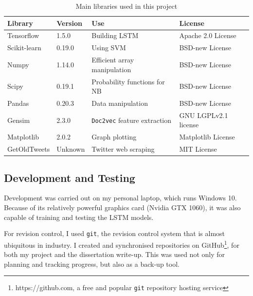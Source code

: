 \documentclass[12pt,a4paper,twoside,openright]{report}
\begin{document}
\begin{table}[H]
\centering
\begin{tabular}{llll}
\toprule
\textbf{Library}                        & \textbf{Version} & \textbf{Use} & \textbf{License} \\ \midrule
Tensorflow                             & 1.5.0            & Building LSTM        & Apache 2.0 License              \\ [0.5ex]
Scikit-learn                           & 0.19.0           & Using SVM        & BSD-new License              \\ [0.5ex]
Numpy                                  & 1.14.0           & Efficient array manipulation        & BSD-new License              \\ [0.5ex]
Scipy                                  & 0.19.1           & Probability functions for NB        & BSD-new License              \\ [0.5ex]
Pandas                                 & 0.20.3           & Data manipulation        & BSD-new License              \\ [0.5ex]
Gensim								   & 2.3.0			  &	\texttt{Doc2vec} feature extraction			& GNU LGPLv2.1 license\\ [0.5ex]
Matplotlib							   & 2.0.2			  & Graph plotting 				& Matplotlib License	\\ [0.5ex]
GetOldTweets                           & Unknown          & Twitter web scraping        & MIT License              \\ [0.5ex] \bottomrule
\end{tabular}
\caption{Main libraries used in this project}
\label{table:libs}
\end{table}

\subsection{Development and Testing}

Development was carried out on my personal laptop, which runs Windows 10. Because of its relatively 
powerful graphics card (Nvidia GTX 1060), it was also capable of training and testing the LSTM
models.

For revision control, I used \texttt{git}, the revision control system
that is almost ubiquitous in industry. I created and synchronised repositories on
GitHub\footnote{https://github.com, a free and popular \texttt{git} repository hosting service}, 
for both my project and the dissertation write-up. This was used not only for
planning and tracking progress, but also as a back-up tool. 
\end{document}
